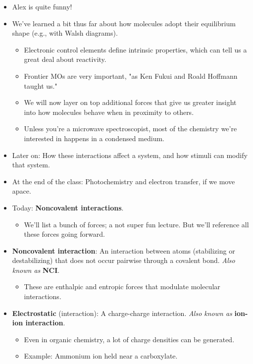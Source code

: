 \documentclass[../notes.tex]{subfiles}
\begin{document}
\begin{itemize}
\begin{itemize}
    \end{itemize}
    \item Alex is quite funny!
    \item We've learned a bit thus far about how molecules adopt their equilibrium shape (e.g., with Walsh diagrams).
    \begin{itemize}
        \item Electronic control elements define intrinsic properties, which can tell us a great deal about reactivity.
        \item Frontier MOs are very important, "as Ken Fukui and Roald Hoffmann taught us."
        \item We will now layer on top additional forces that give us greater insight into how molecules behave when in proximity to others.
        \item Unless you're a microwave spectroscopist, most of the chemistry we're interested in happens in a condensed medium.
    \end{itemize}
    \item Later on: How these interactions affect a system, and how stimuli can modify that system.
    \item At the end of the class: Photochemistry and electron transfer, if we move apace.
    \item Today: \textbf{Noncovalent interactions}.
    \begin{itemize}
        \item We'll list a bunch of forces; a not super fun lecture. But we'll reference all these forces going forward.
    \end{itemize}
    \item \textbf{Noncovalent interaction}: An interaction between atoms (stabilizing or destabilizing) that does not occur pairwise through a covalent bond. \emph{Also known as} \textbf{NCI}.
    \begin{itemize}
        \item These are enthalpic and entropic forces that modulate molecular interactions.
    \end{itemize}
    \item \textbf{Electrostatic} (interaction): A charge-charge interaction. \emph{Also known as} \textbf{ion-ion interaction}.
    \begin{itemize}
        \item Even in organic chemistry, a lot of charge densities can be generated.
        \item Example: Ammonium ion held near a carboxylate.

\end{itemize}
\end{itemize}
\end{document}
